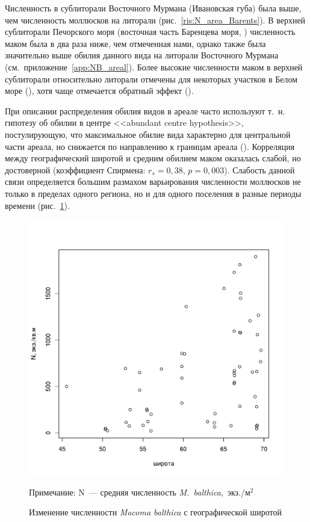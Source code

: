 Численность в сублиторали Восточного Мурмана (Ивановская губа) была выше, чем численность моллюсков на литорали (рис.~\ref{ris:N_area_Barents}).
В верхней сублиторали Печорского моря (восточная часть Баренцева моря, \cite{Denisenko_et_al_2003}) численность маком была в два раза ниже, чем отмеченная нами, однако также была значительно выше обилия данного вида на литорали Восточного Мурмана (см.~приложение~\ref{app:NB_areal}).
Более высокие численности маком в верхней сублиторали относительно литорали отмечены для некоторых участков в Белом море (\cite{Semenova_1974}), хотя чаще отмечается обратный эффект (\cite{Semenova_1974, Maximovich_et_al_1991}).

При описании распределения обилия видов в ареале часто используют т.~н. гипотезу об обилии в центре <<abundant centre hypothesis>>, постулирующую, что максимальное обилие вида характерно для центральной части ареала, но снижается по направлению к границам ареала (\cite{Sagarin_et_al_2006}).
Корреляция между географический широтой и средним обилием маком оказалась слабой, но достоверной (коэффициент Спирмена: $r_{s} = 0,38$, $p = 0,003$).
Слабость данной связи определяется большим размахом варьирования численности моллюсков не только в пределах одного региона, но и для одного поселения в разные периоды времени (рис.~\ref{ris:lat_vs_Nmean}). 
	\begin{figure}[p]
    \includegraphics[width=\textwidth]{../macrodistribution/lat_vs_Nmean1.pdf}
    \caption{Изменение численности {\it Macoma balthica} с географической широтой}

{\footnotesize Примечание: N~--- средняя численность {\it M.~balthica},~экз./м$^2$}
    \label{ris:lat_vs_Nmean}
	\end{figure}
